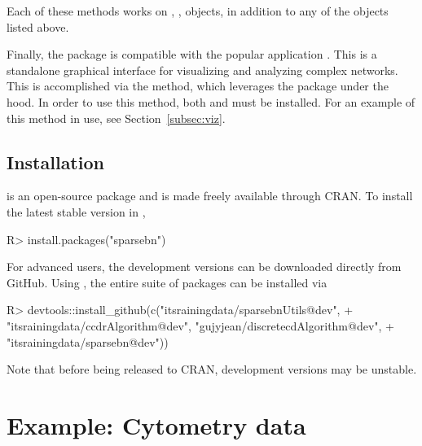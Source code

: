 \documentclass[article]{jss}
\renewcommand{\|}{\,|\,}
\begin{document}
\noindent
Each of these methods works on , ,  objects, in addition to any of the objects listed above.

Finally, the  package is compatible with the popular  application \citep{shannon2003}. This is a standalone graphical interface for visualizing and analyzing complex networks. This is accomplished via the  method, which leverages the  package \citep{shannon2013} under the hood. In order to use this method, both  and  must be installed. For an example of this method in use, see Section~\ref{subsec:viz}.

\subsection{Installation}

 is an open-source package and is made freely available through CRAN. To install the latest stable version in ,
%
\begin{CodeChunk}
\begin{CodeInput}
R> install.packages("sparsebn")
\end{CodeInput}
\end{CodeChunk}
%
For advanced users, the development versions can be downloaded directly from GitHub. Using , the entire suite of packages can be installed via
%
\begin{CodeChunk}
\begin{CodeInput}
R> devtools::install_github(c("itsrainingdata/sparsebnUtils@dev", 
+    "itsrainingdata/ccdrAlgorithm@dev", "gujyjean/discretecdAlgorithm@dev", 
+    "itsrainingdata/sparsebn@dev")) 
\end{CodeInput}
\end{CodeChunk}
%
Note that before being released to CRAN, development versions may be unstable.




\section{Example: Cytometry data}
\label{sec:cyto}
\end{document}

